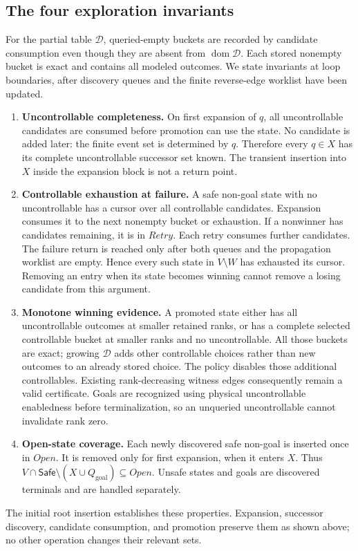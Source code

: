 \documentclass[11pt]{article}
\newcommand{\Safe}{\mathsf{Safe}}
\newcommand{\Goal}{Q_{\mathrm{goal}}}
\begin{document}
\subsection{The four exploration invariants}
For the partial table $\mathcal D$, queried-empty buckets are recorded by candidate consumption even though they are absent from $\operatorname{dom}\mathcal D$. Each stored nonempty bucket is exact and contains all modeled outcomes. We state invariants at loop boundaries, after discovery queues and the finite reverse-edge worklist have been updated.
\begin{enumerate}
\item \textbf{Uncontrollable completeness.} On first expansion of $q$, all uncontrollable candidates are consumed before promotion can use the state. No candidate is added later: the finite event set is determined by $q$. Therefore every $q\in X$ has its complete uncontrollable successor set known. The transient insertion into $X$ inside the expansion block is not a return point.
\item \textbf{Controllable exhaustion at failure.} A safe non-goal state with no uncontrollable has a cursor over all controllable candidates. Expansion consumes it to the next nonempty bucket or exhaustion. If a nonwinner has candidates remaining, it is in $Retry$. Each retry consumes further candidates. The failure return is reached only after both queues and the propagation worklist are empty. Hence every such state in $V\setminus W$ has exhausted its cursor. Removing an entry when its state becomes winning cannot remove a losing candidate from this argument.
\item \textbf{Monotone winning evidence.} A promoted state either has all uncontrollable outcomes at smaller retained ranks, or has a complete selected controllable bucket at smaller ranks and no uncontrollable. All those buckets are exact; growing $\mathcal D$ adds other controllable choices rather than new outcomes to an already stored choice. The policy disables those additional controllables. Existing rank-decreasing witness edges consequently remain a valid certificate. Goals are recognized using physical uncontrollable enabledness before terminalization, so an unqueried uncontrollable cannot invalidate rank zero.
\item \textbf{Open-state coverage.} Each newly discovered safe non-goal is inserted once in $Open$. It is removed only for first expansion, when it enters $X$. Thus $V\cap\Safe\setminus(X\cup\Goal)\subseteq Open$. Unsafe states and goals are discovered terminals and are handled separately.
\end{enumerate}
The initial root insertion establishes these properties. Expansion, successor discovery, candidate consumption, and promotion preserve them as shown above; no other operation changes their relevant sets.
\end{document}
